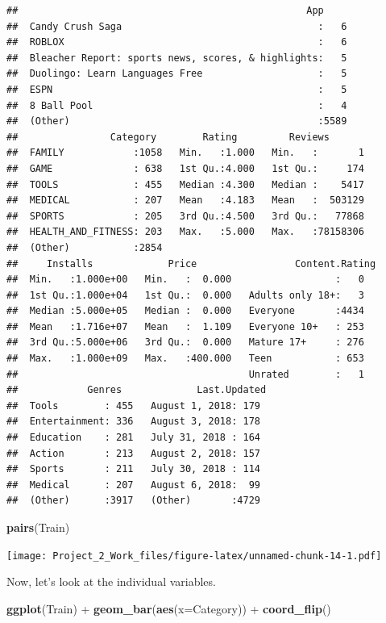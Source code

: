 \documentclass[]{article}
\newenvironment{Shaded}{\begin{snugshade}}{\end{snugshade}}
\newcommand{\KeywordTok}[1]{\textcolor[rgb]{0.13,0.29,0.53}{\textbf{{#1}}}}
\newcommand{\DataTypeTok}[1]{\textcolor[rgb]{0.13,0.29,0.53}{{#1}}}
\newcommand{\StringTok}[1]{\textcolor[rgb]{0.31,0.60,0.02}{{#1}}}
\newcommand{\NormalTok}[1]{{#1}}
\begin{document}
\begin{verbatim}
##                                                  App      
##  Candy Crush Saga                                  :   6  
##  ROBLOX                                            :   6  
##  Bleacher Report: sports news, scores, & highlights:   5  
##  Duolingo: Learn Languages Free                    :   5  
##  ESPN                                              :   5  
##  8 Ball Pool                                       :   4  
##  (Other)                                           :5589  
##                Category        Rating         Reviews        
##  FAMILY            :1058   Min.   :1.000   Min.   :       1  
##  GAME              : 638   1st Qu.:4.000   1st Qu.:     174  
##  TOOLS             : 455   Median :4.300   Median :    5417  
##  MEDICAL           : 207   Mean   :4.183   Mean   :  503129  
##  SPORTS            : 205   3rd Qu.:4.500   3rd Qu.:   77868  
##  HEALTH_AND_FITNESS: 203   Max.   :5.000   Max.   :78158306  
##  (Other)           :2854                                     
##     Installs             Price                 Content.Rating
##  Min.   :1.000e+00   Min.   :  0.000                  :   0  
##  1st Qu.:1.000e+04   1st Qu.:  0.000   Adults only 18+:   3  
##  Median :5.000e+05   Median :  0.000   Everyone       :4434  
##  Mean   :1.716e+07   Mean   :  1.109   Everyone 10+   : 253  
##  3rd Qu.:5.000e+06   3rd Qu.:  0.000   Mature 17+     : 276  
##  Max.   :1.000e+09   Max.   :400.000   Teen           : 653  
##                                        Unrated        :   1  
##            Genres             Last.Updated 
##  Tools        : 455   August 1, 2018: 179  
##  Entertainment: 336   August 3, 2018: 178  
##  Education    : 281   July 31, 2018 : 164  
##  Action       : 213   August 2, 2018: 157  
##  Sports       : 211   July 30, 2018 : 114  
##  Medical      : 207   August 6, 2018:  99  
##  (Other)      :3917   (Other)       :4729
\end{verbatim}

\begin{Shaded}
\begin{Highlighting}[]
\KeywordTok{pairs}\NormalTok{(Train)}
\end{Highlighting}
\end{Shaded}

\texttt{[image: Project\_2\_Work\_files/figure-latex/unnamed-chunk-14-1.pdf]}

Now, let's look at the individual variables.

\begin{Shaded}
\begin{Highlighting}[]
\KeywordTok{ggplot}\NormalTok{(Train) +}\StringTok{ }\KeywordTok{geom_bar}\NormalTok{(}\KeywordTok{aes}\NormalTok{(}\DataTypeTok{x=}\NormalTok{Category)) +}\StringTok{ }\KeywordTok{coord_flip}\NormalTok{()}
\end{Highlighting}
\end{Shaded}
\end{document}
